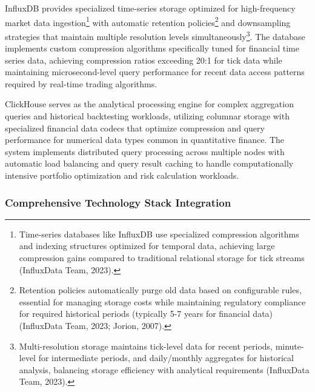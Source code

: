 \documentclass[12pt,a4paper]{article}
\theoremstyle{definition}
\theoremstyle{remark}
\begin{document}
InfluxDB provides specialized time-series storage optimized for high-frequency market data ingestion\footnote{Time-series databases like InfluxDB use specialized compression algorithms and indexing structures optimized for temporal data, achieving large compression gains compared to traditional relational storage for tick streams (InfluxData Team, 2023).} with automatic retention policies\footnote{Retention policies automatically purge old data based on configurable rules, essential for managing storage costs while maintaining regulatory compliance for required historical periods (typically 5-7 years for financial data) (InfluxData Team, 2023; Jorion, 2007).} and downsampling strategies that maintain multiple resolution levels simultaneously\footnote{Multi-resolution storage maintains tick-level data for recent periods, minute-level for intermediate periods, and daily/monthly aggregates for historical analysis, balancing storage efficiency with analytical requirements (InfluxData Team, 2023).}. The database implements custom compression algorithms specifically tuned for financial time series data, achieving compression ratios exceeding 20:1 for tick data while maintaining microsecond-level query performance for recent data access patterns required by real-time trading algorithms.

ClickHouse serves as the analytical processing engine for complex aggregation queries and historical backtesting workloads, utilizing columnar storage with specialized financial data codecs that optimize compression and query performance for numerical data types common in quantitative finance. The system implements distributed query processing across multiple nodes with automatic load balancing and query result caching to handle computationally intensive portfolio optimization and risk calculation workloads.

\subsubsection{Comprehensive Technology Stack Integration}
\end{document}
